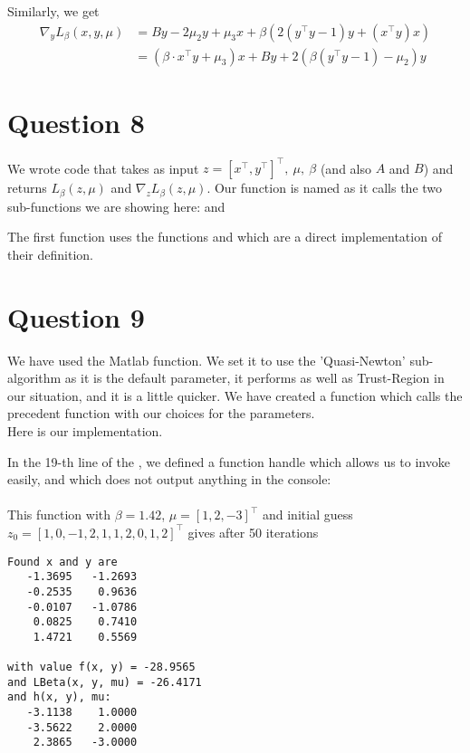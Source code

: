 \documentclass{article}
\newcommand{\tp}{^\top}
\begin{document}
Similarly, we get
\begin{align*}
\nabla_y L_\beta(x,y,\mu)&=By - 2\mu_2 y+\mu_3 x+\beta \left( 2(y\tp y-1)  y+(x\tp y ) x \right) \\
&=(\beta \cdot x\tp y + \mu_3)x+ By + 2(\beta (y\tp y-1) - \mu_2) y
\end{align*}


\section*{Question 8}

We wrote code that takes as input $z = [x\tp, y\tp]\tp,\ \mu,\ \beta$ (and also $A$ and $B$) and returns $L_\beta(z, \mu)$ and $\nabla_z L_\beta(z, \mu)$.
Our function is named  as it calls the two sub-functions we are showing here:  and 






The first function uses the functions  and  which are a direct implementation of their definition.

\section*{Question 9}

We have used the Matlab  function. We set it to use the 'Quasi-Newton' sub-algorithm as it is the default parameter, it performs as well as Trust-Region in our situation, and it is a little quicker.
We have created a function  which calls the precedent function with our choices for the parameters.\\
Here is our implementation.



In the 19-th line of the , we defined a function handle which allows us to invoke  easily, and which does not output anything in the console:\\
\\
This function with $\beta = 1.42$, $\mu = [1, 2, -3]\tp$ and initial guess $z_0 = [1, 0, -1, 2, 1, 1, 2, 0, 1, 2]\tp$  gives after 50 iterations
\begin{lstlisting}
Found x and y are
   -1.3695   -1.2693
   -0.2535    0.9636
   -0.0107   -1.0786
    0.0825    0.7410
    1.4721    0.5569

with value f(x, y) = -28.9565
and LBeta(x, y, mu) = -26.4171
and h(x, y), mu:
   -3.1138    1.0000
   -3.5622    2.0000
    2.3865   -3.0000
\end{lstlisting}
\end{document}
